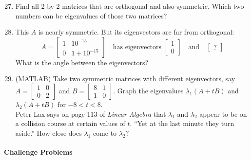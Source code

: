 \documentclass[14pt, a4paper]{article}
\begin{document}
\begin{enumerate}
    \setcounter{enumi}{26}
    \item Find all 2 by 2 matrices that are orthogonal and also symmetric. Which two numbers can be eigenvalues of those two matrices?

    \item This $A$ is nearly symmetric. But its eigenvectors are far from orthogonal:
          \[
              A = \begin{bmatrix} 1 & 10^{-15} \\ 0 & 1 + 10^{-15} \end{bmatrix} \quad \text{has eigenvectors } \begin{bmatrix} 1 \\ 0 \end{bmatrix} \quad \text{and} \quad \begin{bmatrix} ? \end{bmatrix}
          \]
          What is the angle between the eigenvectors?

    \item (MATLAB) Take two symmetric matrices with different eigenvectors, say $A = \begin{bmatrix} 1 & 0 \\ 0 & 2 \end{bmatrix}$ and $B = \begin{bmatrix} 8 & 1 \\ 1 & 0 \end{bmatrix}$. Graph the eigenvalues $\lambda_1(A + tB)$ and $\lambda_2(A + tB)$ for $-8 < t < 8$.\\ Peter Lax says on page 113 of \textit{Linear Algebra} that $\lambda_1$ and $\lambda_2$ appear to be on a collision course at certain values of $t$. ``Yet at the last minute they turn aside.'' How close does $\lambda_1$ come to $\lambda_2$?
\end{enumerate}

\paragraph{Challenge Problems}
\end{document}
